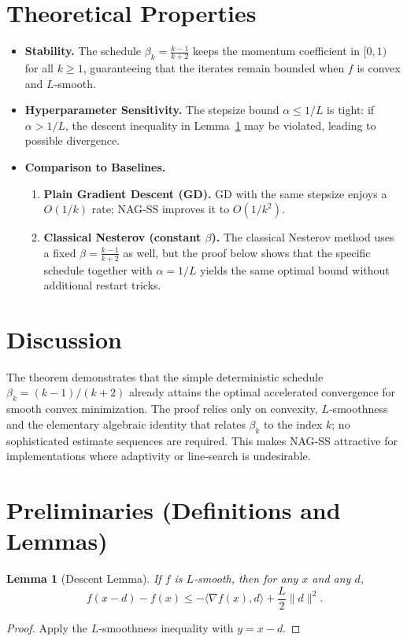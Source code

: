 \documentclass{article}
\newtheorem{lemma}{Lemma}
\newcommand{\grad}{\nabla}
\begin{document}
\section*{Theoretical Properties}
\begin{itemize}
\item \textbf{Stability.} The schedule $\beta_k=\frac{k-1}{k+2}$ keeps the momentum coefficient in $[0,1)$ for all $k\ge 1$, guaranteeing that the iterates remain bounded when $f$ is convex and $L$‑smooth.
\item \textbf{Hyperparameter Sensitivity.} The stepsize bound $\alpha\le 1/L$ is tight: if $\alpha>1/L$, the descent inequality in Lemma~\ref{lem:descent} may be violated, leading to possible divergence.
\item \textbf{Comparison to Baselines.}
    \begin{enumerate}
        \item \textbf{Plain Gradient Descent (GD).} GD with the same stepsize enjoys a $O(1/k)$ rate; NAG‑SS improves it to $O(1/k^2)$.
        \item \textbf{Classical Nesterov (constant $\beta$).} The classical Nesterov method uses a fixed $\beta=\frac{k-1}{k+2}$ as well, but the proof below shows that the specific schedule together with $\alpha=1/L$ yields the same optimal bound without additional restart tricks.
    \end{enumerate}
\end{itemize}

\section*{Discussion}
The theorem demonstrates that the simple deterministic schedule $\beta_k=(k-1)/(k+2)$ already attains the optimal accelerated convergence for smooth convex minimization. The proof relies only on convexity, $L$‑smoothness and the elementary algebraic identity that relates $\beta_k$ to the index $k$; no sophisticated estimate sequences are required. This makes NAG‑SS attractive for implementations where adaptivity or line‑search is undesirable.

\newpage
\section*{Preliminaries (Definitions and Lemmas)}
\begin{lemma}[Descent Lemma]\label{lem:descent}
If $f$ is $L$‑smooth, then for any $x$ and any $d$,
\[
f(x-d)-f(x)\le -\langle \grad f(x),d\rangle+\frac{L}{2}\|d\|^2 .
\]
\end{lemma}
\begin{proof}
Apply the $L$‑smoothness inequality with $y=x-d$.
\end{proof}
\end{document}
